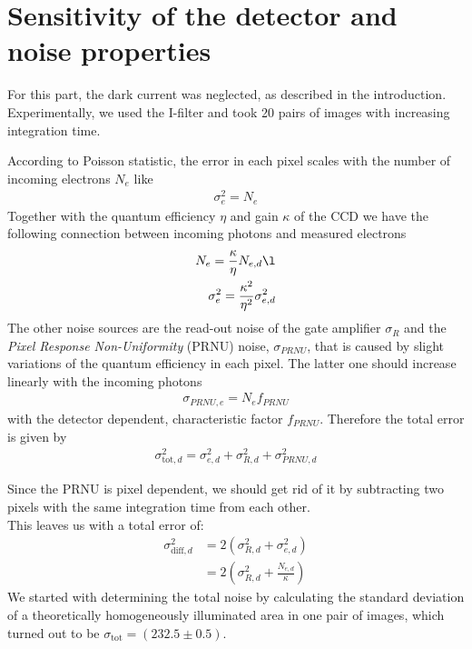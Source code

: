 \section{Sensitivity of the detector and noise properties}
For this part, the dark current was neglected, as described in the introduction.\\
Experimentally,  we used the I-filter and took 20 pairs of images with increasing integration time.

According to Poisson statistic, the error in each pixel scales with the number of incoming electrons $N_e$ like
\begin{align}
\sigma_e^2 = N_e
\end{align}
Together with the quantum efficiency $\eta$ and gain $\kappa$ of the CCD 
we have the following connection between incoming photons and measured electrons
\begin{align}
N_e = \frac{\kappa}{\eta} N_{e, d} \l\\
\sigma_e^2 = \frac{\kappa^2}{\eta^2} \sigma_{e, d}^2
\end{align}
The other noise sources are the read-out noise of the gate amplifier $\sigma_R$ and the 
\textit{Pixel Response Non-Uniformity} (PRNU) noise, $\sigma_{PRNU}$, 
that is caused by slight variations of the quantum efficiency in each pixel.
The latter one should increase linearly with the incoming photons
\begin{align}
\sigma_{PRNU, e} = N_e f_{PRNU} \label{eq: prnu}
\end{align}
with the detector dependent, characteristic factor $f_{PRNU}$.
Therefore the total error is given by
\begin{align}
\sigma_{\text{tot}, d}^2 = \sigma_{e, d}^2 + \sigma_{R, d}^2 + \sigma_{PRNU, d}^2
\end{align}

Since the PRNU is pixel dependent, we should get rid of it by subtracting two pixels with the same integration time from each other.\\
This leaves us with a total error of:
\begin{align}
\sigma_{\text{diff}, d}^2 &= 2 \left(\sigma_{R, d}^2 + \sigma_{e, d}^2\right)\\
&= 2 \left(\sigma_{R, d}^2 + \frac{N_{e, d}}{\kappa}\right)\label{eqn: linear error}
\end{align}
We started with determining the total noise by calculating the standard deviation of a theoretically homogeneously illuminated area in one pair of images, 
which turned out to be $\sigma_{\text{tot}} = (232.5 \pm 0.5)$. \\

